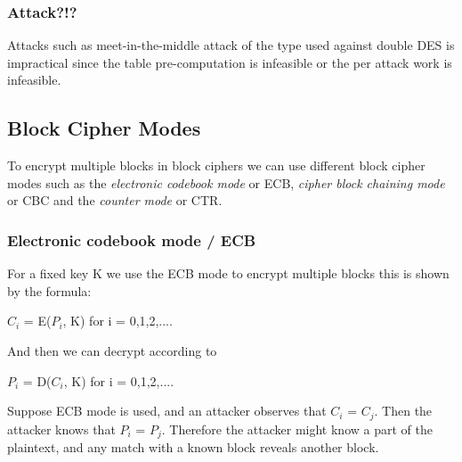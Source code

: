 \documentclass[a4paper]{article}
\begin{document}
\subsubsection{Attack?!?}
Attacks such as meet-in-the-middle attack of the type used against double DES is impractical since the table pre-computation is infeasible or the per attack work is infeasible.

\subsection{Block Cipher Modes}
To encrypt multiple blocks in block ciphers we can use different block cipher modes such as the \textit{electronic codebook mode} or ECB, \textit{cipher block chaining mode} or CBC and the \textit{counter mode} or CTR.

\subsubsection{Electronic codebook mode / ECB}
For a fixed key K we use the ECB mode to encrypt multiple blocks this is shown by the formula:
\begin{center}
    $C_i$ = E($P_i$, K) for i = 0,1,2,....
\end{center}{}
And then we can decrypt according to
\begin{center}
    $P_i$ = D($C_i$, K) for i = 0,1,2,....
\end{center}{}
Suppose ECB mode is used, and an attacker observes that $C_i$ = $C_j$. Then the attacker knows that $P_i$ = $P_j$. Therefore the attacker might know a part of the plaintext, and any match with a known block reveals another block.
\end{document}
